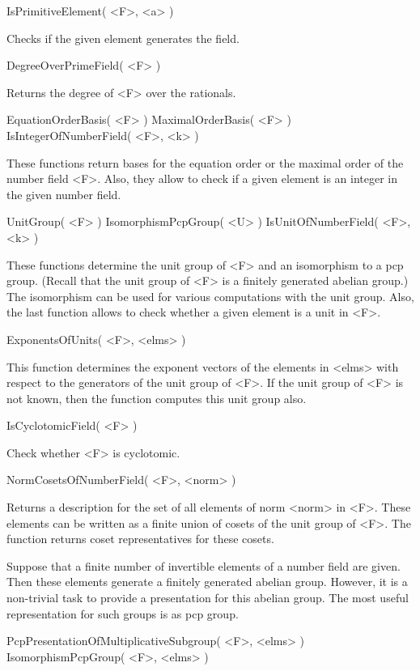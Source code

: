 \> IsPrimitiveElement( <F>, <a> )

Checks if the given element generates the field.

\> DegreeOverPrimeField( <F> )

Returns the degree of <F> over the rationals. 

\> EquationOrderBasis( <F> )
\> MaximalOrderBasis( <F> )
\> IsIntegerOfNumberField( <F>, <k> )

These functions return bases for the equation order or the maximal order
of the number field <F>. Also, they allow to check if a given element is
an integer in the given number field.

\> UnitGroup( <F> )
\> IsomorphismPcpGroup( <U> )
\> IsUnitOfNumberField( <F>, <k> )

These functions determine the unit group of <F> and an isomorphism to
a pcp group. (Recall that the unit group of <F> is a finitely generated 
abelian group.) The isomorphism can be used for various computations with
the unit group. Also, the last function allows to check whether a given
element is a unit in <F>. 

\> ExponentsOfUnits( <F>, <elms> )

This function determines the exponent vectors of the elements in <elms>
with respect to the generators of the unit group of <F>. If the unit
group of <F> is not known, then the function computes this unit group also.

\> IsCyclotomicField( <F> )

Check whether <F> is cyclotomic.

\> NormCosetsOfNumberField( <F>, <norm> )

Returns a description for the set of all elements of norm <norm> in <F>. 
These elements can be written as a finite union of cosets of the unit
group of <F>. The function returns coset representatives for these cosets.

\label{section_present}

Suppose that a finite number of
invertible elements
of a number field are given. Then these elements generate a finitely
generated abelian group. However, it is a non-trivial task to provide
a presentation for this abelian group. The most useful representation
for such groups is as pcp group.

\> PcpPresentationOfMultiplicativeSubgroup( <F>, <elms> )
\> IsomorphismPcpGroup( <F>, <elms> )

